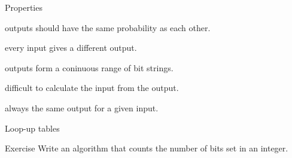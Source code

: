 \documentclass{beamer}
\begin{document}
\begin{frame}{Properties}
  \begin{description}
    \setlength\itemsep{6mm}
    \item[Uniform:] outputs should have the same probability as each other.
    \item[Prefect:] every input gives a different output.
    \item[Minimal:] outputs form a coninuous range of bit strings.
    \item[Cryptographic:] difficult to calculate the input from the output.
    \item[Deterministic:] always the same output for a given input.
  \end{description}
\end{frame}

\begin{frame}{Loop-up tables}
  \begin{exampleblock}{Exercise}
    Write an algorithm that counts the number of bits set in an integer.
  \end{exampleblock}
\end{frame}
\end{document}
